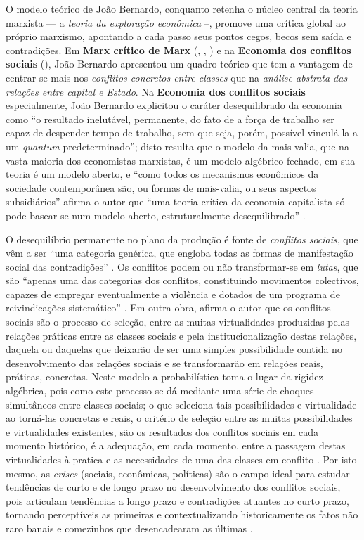 O modelo teórico de João Bernardo, conquanto retenha o núcleo central da teoria marxista --- a \textit{teoria da exploração econômica} --, promove uma crítica global ao próprio marxismo, apontando a cada passo seus pontos cegos, becos sem saída e contradições. Em \textbf{Marx crítico de Marx} (\citeyear{BERNARDO1977a}, \citeyear{BERNARDO1977b}, \citeyear{BERNARDO1977c}) e na \textbf{Economia dos conflitos sociais} (\citeyear{BERNARDO1991}), João Bernardo apresentou um quadro teórico que tem a vantagem de centrar-se mais nos \textit{conflitos concretos entre classes} que na \textit{análise abstrata das relações entre capital e Estado}. Na \textbf{Economia dos conflitos sociais} especialmente, João Bernardo explicitou o caráter desequilibrado da economia como ``o resultado inelutável, permanente, do fato de a força de trabalho ser capaz de despender tempo de trabalho, sem que seja, porém, possível vinculá-la a um \textit{quantum} predeterminado''; disto resulta que o modelo da mais-valia, que na vasta maioria dos economistas marxistas, é um modelo algébrico fechado, em sua teoria é um modelo aberto, e ``como todos os mecanismos econômicos da sociedade contemporânea são, ou formas de mais-valia, ou seus aspectos subsidiários'' afirma o autor que ``uma teoria crítica da economia capitalista só pode basear-se num modelo aberto, estruturalmente desequilibrado'' \cite[p.~62]{BERNARDO1991}. 

O desequilíbrio permanente no plano da produção é fonte de \textit{conflitos sociais}, que vêm a ser ``uma categoria genérica, que engloba todas as formas de manifestação social das contradições'' \cite[p.~10]{BERNARDO1997}. Os conflitos podem ou não transformar-se em \textit{lutas}, que são ``apenas uma das categorias dos conflitos, constituindo movimentos colectivos, capazes de empregar eventualmente a violência e dotados de um programa de reivindicações sistemático'' \cite[p.~10]{BERNARDO1997}. Em outra obra, afirma o autor que os conflitos sociais são o processo de seleção, entre as muitas virtualidades produzidas pelas relações práticas entre as classes sociais e pela institucionalização destas relações, daquela ou daquelas que deixarão de ser uma simples possibilidade contida no desenvolvimento das relações sociais e se transformarão em relações reais, práticas, concretas. Neste modelo a probabilística toma o lugar da rigidez algébrica, pois como este processo se dá mediante uma série de choques simultâneos entre classes sociais; o que seleciona tais possibilidades e virtualidade ao torná-las concretas e reais, o critério de seleção entre as muitas possibilidades e virtualidades existentes, são os resultados dos conflitos sociais em cada momento histórico, é a adequação, em cada momento, entre a passagem destas virtualidades à pratica e as necessidades de uma das classes em conflito \cite[p.~31-32]{BERNARDO1991a}. Por isto mesmo, as \textit{crises} (sociais, econômicas, políticas) são o campo ideal para estudar tendências de curto e de longo prazo no desenvolvimento dos conflitos sociais, pois articulam tendências a longo prazo e contradições atuantes no curto prazo, tornando perceptíveis as primeiras e contextualizando historicamente os fatos não raro banais e comezinhos que desencadearam as últimas \cite[p.~128]{BERNARDO1997}.

